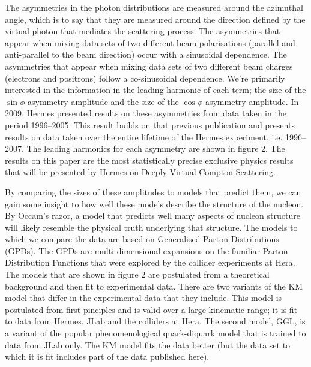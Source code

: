 \documentclass[11pt]{article}
\begin{document}
The asymmetries in the photon distributions are measured around the azimuthal angle, which is to say that they are measured around the direction defined by the virtual photon that mediates the scattering process. The asymmetries that appear when mixing data sets of two different beam polarisations (parallel and anti-parallel to the beam direction) occur with a sinusoidal dependence. The asymmetries that appear when mixing data sets of two different beam charges (electrons and positrons) follow a co-sinusoidal dependence. We're primarily interested in the information in the leading harmonic of each term; the size of the $\sin\phi$ asymmetry amplitude and the size of the $\cos\phi$ asymmetry amplitude. In 2009, H{\sc ermes} presented results on these asymmetries from data taken in the period 1996--2005. This result builds on that previous publication and presents results on data taken over the entire lifetime of the H{\sc ermes} experiment, i.e. 1996--2007. The leading harmonics for each asymmetry are shown in figure 2. The results on this paper are the most statistically precise exclusive physics results that will be presented by H{\sc ermes} on Deeply Virtual Compton Scattering.

By comparing the sizes of these amplitudes to models that predict them, we can gain some insight to how well these models describe the structure of the nucleon. By Occam's razor, a model that predicts well many aspects of nucleon structure will likely resemble the physical truth underlying that structure. The models to which we compare the data are based on Generalised Parton Distributions (GPDs). The GPDs are multi-dimensional expansions on the familiar Parton Distribution Functions that were explored by the collider experiments at H{\sc era}. The models that are shown in figure 2 are postulated from a theoretical background and then fit to experimental data. There are two variants of the KM model that differ in the experimental data that they include. This model is postulated from first pinciples and is valid over a large kinematic range; it is fit to data from H{\sc ermes}, JLab and the colliders at H{\sc era}. The second model, GGL, is a variant of the popular phenomenological quark-diquark model that is trained to data from JLab only. The KM model fits the data better (but the data set to which it is fit includes part of the data published here).
\end{document}
